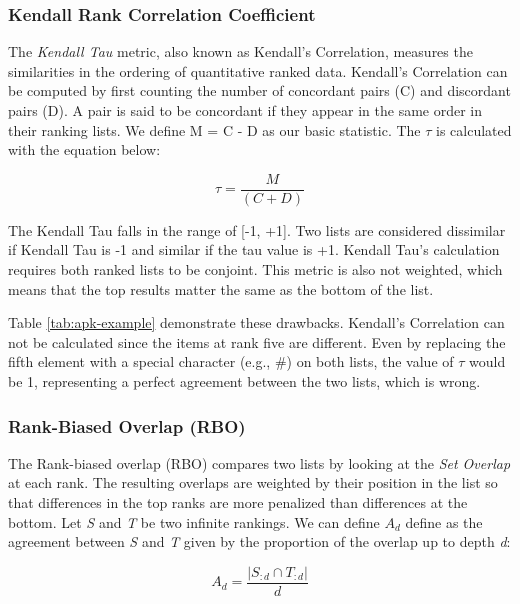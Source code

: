 \subsubsection{Kendall Rank Correlation Coefficient}
The \emph{Kendall Tau} \cite{kendallNewMeasureRank1938} metric, also known as Kendall's Correlation, measures the similarities in the ordering of quantitative ranked data. Kendall's Correlation can be computed by first counting the number of concordant pairs (C) and discordant pairs (D). A pair is said to be concordant if they appear in the same order in their ranking lists. We define M = C - D as our basic statistic. The $\tau$ is calculated with the equation below: 

\begin{equation}
    \tau = \frac{M}{(C+D)}
    \label{eq:kendall-tau}
\end{equation}

The Kendall Tau falls in the range of [-1, +1]. Two lists are considered dissimilar if Kendall Tau is -1 and similar if the tau value is +1. Kendall Tau's calculation requires both ranked lists to be conjoint. This metric is also not weighted, which means that the top results matter the same as the bottom of the list.

Table \ref{tab:apk-example} demonstrate these drawbacks. Kendall's Correlation can not be calculated since the items at rank five are different. Even by replacing the fifth element with a special character (e.g., \#) on both lists, the value of $\tau$ would be 1, representing a perfect agreement between the two lists, which is wrong.

\subsubsection{Rank-Biased Overlap (RBO)}
\label{subsubsec:rbo}
The Rank-biased overlap (RBO) \cite{webberSimilarityMeasureIndefinite2010} compares two lists by looking at the \emph{Set Overlap} at each rank. The resulting overlaps are weighted by their position in the list so that differences in the top ranks are more penalized than differences at the bottom. Let \emph{S} and \emph{T} be two infinite rankings. We can define $A_{d}$ define as the agreement between \emph{S} and \emph{T} given by the proportion of the overlap up to depth \emph{d}:

\begin{equation}
    A_{d} = \frac{|S_{:d} \cap T_{:d}|}{d}
    \label{eq:a-d}
\end{equation}



